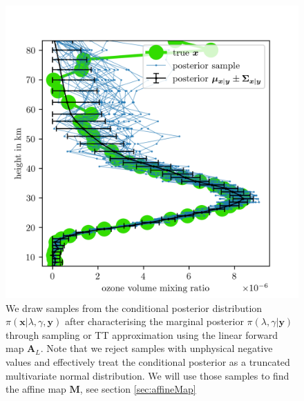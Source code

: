 \begin{figure}[ht!]
	\centering
	\includegraphics{FirstTestRes.png}
	\caption[Ozone samples of the conditional posterior.]{We draw samples from the conditional posterior distribution  $\pi(\bm{x}|\lambda,\gamma , \bm{y})$ after characterising the marginal posterior $\pi(\lambda,\gamma | \bm{y})$ through sampling or TT approximation using the linear forward map $\bm{A}_L$. Note that we reject samples with unphysical negative values and effectively treat the conditional posterior as a truncated multivariate normal distribution. We will use those samples to find the affine map $\bm{M}$, see section \ref{sec:affineMap}}
	\label{fig:O3Samp}
\end{figure}


